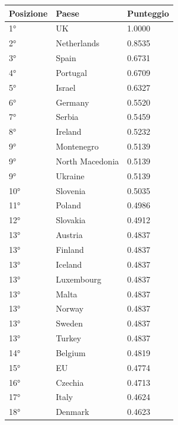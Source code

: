 \documentclass[a4paper,12pt, openright]{report}
\begin{document}
\begin{table}[h!]
    \centering
    \begin{tabular}{ |l|l|l|  }
        \hline
        \textbf{Posizione} & \textbf{Paese} & \textbf{Punteggio} \\
        \hline
        1° & UK & 1.0000  \\
        \hline
        2° & Netherlands  & 0.8535 \\
        \hline
        3° & Spain  & 0.6731 \\
        \hline
        4° & Portugal  & 0.6709 \\
        \hline
        5° & Israel & 0.6327 \\
        \hline
        6° & Germany & 0.5520\\
        \hline
        7° & Serbia  & 0.5459\\
        \hline
        8° & Ireland  & 0.5232\\
        \hline
        9° & Montenegro  & 0.5139\\
        \hline
        9° & North Macedonia & 0.5139 \\
        \hline
        9° & Ukraine  & 0.5139\\
        \hline
        10° & Slovenia  & 0.5035 \\
        \hline
        11° & Poland  & 0.4986 \\
        \hline
        12° & Slovakia  & 0.4912 \\
        \hline
        13° & Austria  & 0.4837\\
        \hline
        13° & Finland  & 0.4837\\
        \hline
        13° & Iceland  & 0.4837\\
        \hline
        13° & Luxembourg  & 0.4837\\
        \hline
        13° & Malta  & 0.4837\\
        \hline
        13° & Norway  & 0.4837\\
        \hline
        13° & Sweden  & 0.4837\\
        \hline
        13° & Turkey  & 0.4837 \\
        \hline
        14° & Belgium  & 0.4819 \\
        \hline
        15° & EU  & 0.4774 \\
        \hline
        16° & Czechia  & 0.4713 \\
        \hline
        17° & Italy  & 0.4624 \\
        \hline
        18° & Denmark & 0.4623 \\

\end{tabular}
\end{table}
\end{document}

